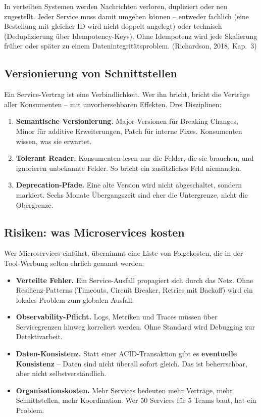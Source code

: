 \documentclass[11pt,a4paper,oneside]{article}
\newcommand{\fachbegriff}[1]{\textbf{#1}}
\newcommand{\quelle}[1]{{\footnotesize\color{lpGray}(#1)}}
\begin{document}
\begin{merkbox}
In verteilten Systemen werden Nachrichten verloren, dupliziert oder neu zugestellt. Jeder Service muss damit umgehen können -- entweder fachlich (eine Bestellung mit gleicher ID wird nicht doppelt angelegt) oder technisch (Deduplizierung über Idempotency-Keys). Ohne Idempotenz wird jede Skalierung früher oder später zu einem Datenintegritätsproblem. \quelle{Richardson, 2018, Kap.~3}
\end{merkbox}

\subsection{Versionierung von Schnittstellen}

Ein Service-Vertrag ist eine Verbindlichkeit. Wer ihn bricht, bricht die Verträge aller Konsumenten -- mit unvorhersehbaren Effekten. Drei Disziplinen:

\begin{enumerate}
  \item \textbf{Semantische Versionierung.} Major-Versionen für Breaking Changes, Minor für additive Erweiterungen, Patch für interne Fixes. Konsumenten wissen, was sie erwartet.
  \item \textbf{Tolerant Reader.} Konsumenten lesen nur die Felder, die sie brauchen, und ignorieren unbekannte Felder. So bricht ein zusätzliches Feld niemanden.
  \item \textbf{Deprecation-Pfade.} Eine alte Version wird nicht abgeschaltet, sondern markiert. Sechs Monate Übergangszeit sind eher die Untergrenze, nicht die Obergrenze.
\end{enumerate}

\subsection{Risiken: was Microservices kosten}

Wer Microservices einführt, übernimmt eine Liste von Folgekosten, die in der Tool-Werbung selten ehrlich genannt werden:

\begin{itemize}
  \item \textbf{Verteilte Fehler.} Ein Service-Ausfall propagiert sich durch das Netz. Ohne Resilienz-Patterns (Timeouts, Circuit Breaker, Retries mit Backoff) wird ein lokales Problem zum globalen Ausfall.
  \item \textbf{Observability-Pflicht.} Logs, Metriken und Traces müssen über Servicegrenzen hinweg korreliert werden. Ohne Standard wird Debugging zur Detektivarbeit.
  \item \textbf{Daten-Konsistenz.} Statt einer ACID-Transaktion gibt es \fachbegriff{eventuelle Konsistenz} -- Daten sind nicht überall sofort gleich. Das ist beherrschbar, aber nicht selbstverständlich.
  \item \textbf{Organisationskosten.} Mehr Services bedeuten mehr Verträge, mehr Schnittstellen, mehr Koordination. Wer 50 Services für 5 Teams baut, hat ein Problem.
\end{itemize}
\end{document}
